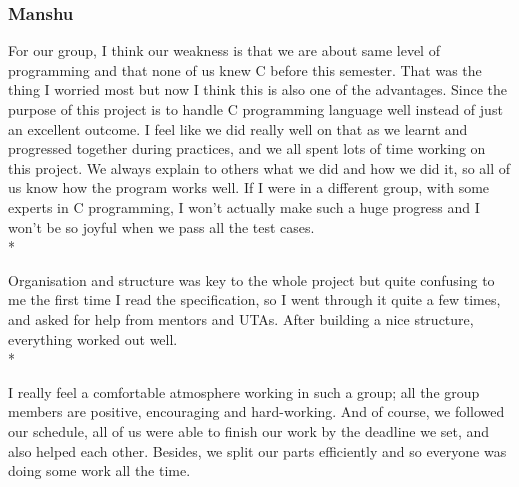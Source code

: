 \documentclass[letterpaper,11pt]{article}
\begin{document}
    \subsubsection{Manshu}
    For our group, I think our weakness is that we are about same level of programming and that none of us knew C before this semester. That was the thing I worried most but now I think this is also one of the advantages. Since the purpose of this project is to handle C programming language well instead of just an excellent outcome. I feel like we did really well on that as we learnt and progressed together during practices, and we all spent lots of time working on this project. We always explain to others what we did and how we did it, so all of us know how the program works well. If I were in a different group, with some experts in C programming, I won’t actually make such a huge progress and I won’t be so joyful when we pass all the test cases.\\*

    \noindent Organisation and structure was key to the whole project but quite confusing to me the first time I read the specification, so I went through it quite a few times, and asked for help from mentors and UTAs. After building a nice structure, everything worked out well.\\*

    \noindent I really feel a comfortable atmosphere working in such a group; all the group members are positive, encouraging and hard-working. And of course, we followed our schedule, all of us were able to finish our work by the deadline we set, and also helped each other. Besides, we split our parts efficiently and so everyone was doing some work all the time.
\end{document}
